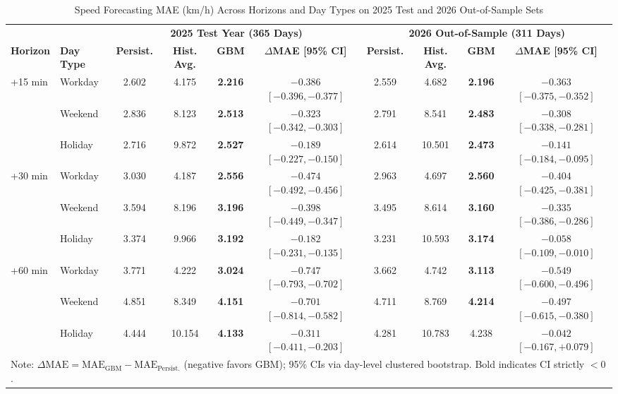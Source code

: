 \documentclass[conference]{IEEEtran}
\begin{document}
\begin{table}[!t]
\caption{Speed Forecasting MAE (km/h) Across Horizons and Day Types on 2025 Test and 2026 Out-of-Sample Sets}
\label{tab:mae_results}
\centering
\footnotesize
\setlength{\tabcolsep}{4.5pt}
\begin{tabular}{llcccccccc}
\toprule
 & & \multicolumn{4}{c}{\textbf{2025 Test Year (365 Days)}} & \multicolumn{4}{c}{\textbf{2026 Out-of-Sample (311 Days)}} \\
\cmidrule(lr){3-6} \cmidrule(lr){7-10}
\textbf{Horizon} & \textbf{Day Type} & \textbf{Persist.} & \textbf{Hist. Avg.} & \textbf{GBM} & \textbf{$\Delta$MAE [95\% CI]} & \textbf{Persist.} & \textbf{Hist. Avg.} & \textbf{GBM} & \textbf{$\Delta$MAE [95\% CI]} \\
\midrule
\multirow{3}{*}{+15 min}
  & Workday   & 2.602 & 4.175 & \textbf{2.216} & $-0.386$ $[-0.396, -0.377]$ & 2.559 & 4.682 & \textbf{2.196} & $-0.363$ $[-0.375, -0.352]$ \\
  & Weekend   & 2.836 & 8.123 & \textbf{2.513} & $-0.323$ $[-0.342, -0.303]$ & 2.791 & 8.541 & \textbf{2.483} & $-0.308$ $[-0.338, -0.281]$ \\
  & Holiday   & 2.716 & 9.872 & \textbf{2.527} & $-0.189$ $[-0.227, -0.150]$ & 2.614 & 10.501 & \textbf{2.473} & $-0.141$ $[-0.184, -0.095]$ \\
\midrule
\multirow{3}{*}{+30 min}
  & Workday   & 3.030 & 4.187 & \textbf{2.556} & $-0.474$ $[-0.492, -0.456]$ & 2.963 & 4.697 & \textbf{2.560} & $-0.404$ $[-0.425, -0.381]$ \\
  & Weekend   & 3.594 & 8.196 & \textbf{3.196} & $-0.398$ $[-0.449, -0.347]$ & 3.495 & 8.614 & \textbf{3.160} & $-0.335$ $[-0.386, -0.286]$ \\
  & Holiday   & 3.374 & 9.966 & \textbf{3.192} & $-0.182$ $[-0.231, -0.135]$ & 3.231 & 10.593 & \textbf{3.174} & $-0.058$ $[-0.109, -0.010]$ \\
\midrule
\multirow{3}{*}{+60 min}
  & Workday   & 3.771 & 4.222 & \textbf{3.024} & $-0.747$ $[-0.793, -0.702]$ & 3.662 & 4.742 & \textbf{3.113} & $-0.549$ $[-0.600, -0.496]$ \\
  & Weekend   & 4.851 & 8.349 & \textbf{4.151} & $-0.701$ $[-0.814, -0.582]$ & 4.711 & 8.769 & \textbf{4.214} & $-0.497$ $[-0.615, -0.380]$ \\
  & Holiday   & 4.444 & 10.154 & \textbf{4.133} & $-0.311$ $[-0.411, -0.203]$ & 4.281 & 10.783 & 4.238 & $-0.042$ $[-0.167, +0.079]$ \\
\bottomrule
\multicolumn{10}{l}{\scriptsize Note: $\Delta\text{MAE} = \text{MAE}_{\text{GBM}} - \text{MAE}_{\text{Persist.}}$ (negative favors GBM); 95\% CIs via day-level clustered bootstrap. Bold indicates CI strictly $<0$.}
\end{tabular}
\end{table}
\end{document}
